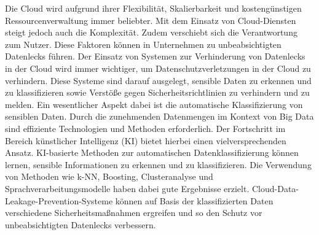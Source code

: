 Die Cloud wird aufgrund ihrer Flexibilität, Skalierbarkeit und kostengünstigen Ressourcenverwaltung immer beliebter. Mit dem Einsatz von Cloud-Diensten steigt jedoch auch die Komplexität. Zudem verschiebt sich die Verantwortung zum Nutzer. Diese Faktoren können in Unternehmen zu unbeabsichtigten Datenlecks führen. Der Einsatz von Systemen zur Verhinderung von Datenlecks in der Cloud wird immer wichtiger, um Datenschutzverletzungen in der Cloud zu verhindern. Diese Systeme sind darauf ausgelegt, sensible Daten zu erkennen und zu klassifizieren sowie Verstöße gegen Sicherheitsrichtlinien zu verhindern und zu melden. Ein wesentlicher Aspekt dabei ist die automatische Klassifizierung von sensiblen Daten. Durch die zunehmenden Datenmengen im Kontext von Big Data sind effiziente Technologien und Methoden erforderlich. Der Fortschritt im Bereich künstlicher Intelligenz (KI) bietet hierbei einen vielversprechenden Ansatz. KI-basierte Methoden zur automatischen Datenklassifizierung können lernen, sensible Informationen zu erkennen und zu klassifizieren. Die Verwendung von Methoden wie k-NN, Boosting, Clusteranalyse und Sprachverarbeitungsmodelle haben dabei gute Ergebnisse erzielt. Cloud-Data-Leakage-Prevention-Systeme können auf Basis der klassifizierten Daten verschiedene Sicherheitsmaßnahmen ergreifen und so den Schutz vor unbeabsichtigten Datenlecks verbessern.

